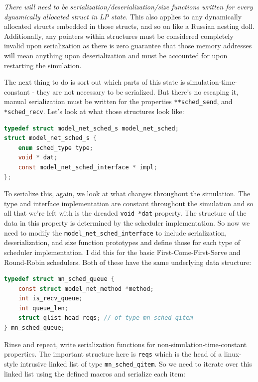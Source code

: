 \documentclass[letterpaper, 11 pt, conference]{IEEEtran}
\begin{document}
\emph{There will need to be serialization/deserialization/size functions written for every dynamically allocated struct in LP state.} This also applies to any dynamically allocated structs embedded in those structs, and so on like a Russian nesting doll. Additionally, any pointers within structures must be considered completely invalid upon serialization as there is zero guarantee that those memory addresses will mean anything upon deserialization and must be accounted for upon restarting the simulation.

The next thing to do is sort out which parts of this state is simulation-time-constant - they are not necessary to be serialized. But there's no escaping it, manual serialization must be written for the properties \texttt{**sched\_send}, and \texttt{*sched\_recv}. Let's look at what those structures look like:

\begin{lstlisting}[language=C]
typedef struct model_net_sched_s model_net_sched;
struct model_net_sched_s {
	enum sched_type type;
	void * dat;
	const model_net_sched_interface * impl;
};
\end{lstlisting}

To serialize this, again, we look at what changes throughout the simulation. The type and interface implementation are constant throughout the simulation and so all that we're left with is the dreaded \texttt{void *dat} property. The structure of the data in this property is determined by the scheduler implementation. So now we need to modify the \texttt{model\_net\_sched\_interface} to include serialization, deserialization, and size function prototypes and define those for each type of scheduler implementation. I did this for the basic First-Come-First-Serve and Round-Robin schedulers. Both of these have the same underlying data structure:

\begin{lstlisting}[language=C]
typedef struct mn_sched_queue {
	const struct model_net_method *method;
	int is_recv_queue;
	int queue_len;
	struct qlist_head reqs; // of type mn_sched_qitem
} mn_sched_queue;
\end{lstlisting}

Rinse and repeat, write serialization functions for non-simulation-time-constant properties. The important structure here is \texttt{reqs} which is the head of a linux-style intrusive linked list of type \texttt{mn\_sched\_qitem}. So we need to iterate over this linked list using the defined macros and serialize each item:
\end{document}
